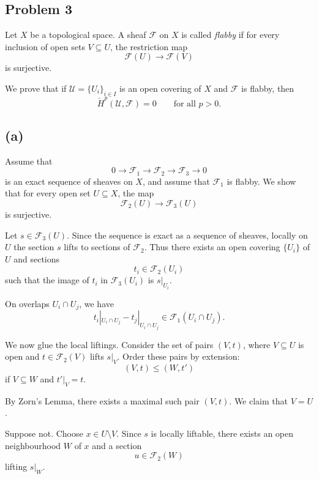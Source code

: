 
\subsection{Problem 3}

Let $X$ be a topological space. A sheaf $\mathcal F$ on $X$ is called
\emph{flabby} if for every inclusion of open sets $V \subseteq U$, the
restriction map
\[
\mathcal F(U) \longrightarrow \mathcal F(V)
\]
is surjective.

We prove that if $\mathcal U=\{U_i\}_{i\in I}$ is an open covering of $X$
and $\mathcal F$ is flabby, then
\[
\check H^p(\mathcal U,\mathcal F)=0
\qquad \text{for all } p>0.
\]

\subsection*{(a)}

Assume that
\[
0 \longrightarrow \mathcal F_1
\longrightarrow \mathcal F_2
\longrightarrow \mathcal F_3
\longrightarrow 0
\]
is an exact sequence of sheaves on $X$, and assume that $\mathcal F_1$ is
flabby. We show that for every open set $U\subseteq X$, the map
\[
\mathcal F_2(U)\longrightarrow \mathcal F_3(U)
\]
is surjective.

Let $s\in \mathcal F_3(U)$. Since the sequence is exact as a sequence of
sheaves, locally on $U$ the section $s$ lifts to sections of $\mathcal F_2$.
Thus there exists an open covering $\{U_i\}$ of $U$ and sections
\[
t_i\in \mathcal F_2(U_i)
\]
such that the image of $t_i$ in $\mathcal F_3(U_i)$ is $s|_{U_i}$.

On overlaps $U_i\cap U_j$, we have
\[
t_i|_{U_i\cap U_j}-t_j|_{U_i\cap U_j}
\in \mathcal F_1(U_i\cap U_j).
\]

We now glue the local liftings. Consider the set of pairs $(V,t)$, where
$V\subseteq U$ is open and $t\in \mathcal F_2(V)$ lifts $s|_V$.
Order these pairs by extension:
\[
(V,t)\leq (W,t')
\]
if $V\subseteq W$ and $t'|_V=t$.

By Zorn's Lemma, there exists a maximal such pair $(V,t)$. We claim that
$V=U$.

Suppose not. Choose $x\in U\setminus V$. Since $s$ is locally liftable,
there exists an open neighbourhood $W$ of $x$ and a section
\[
u\in \mathcal F_2(W)
\]
lifting $s|_W$.

